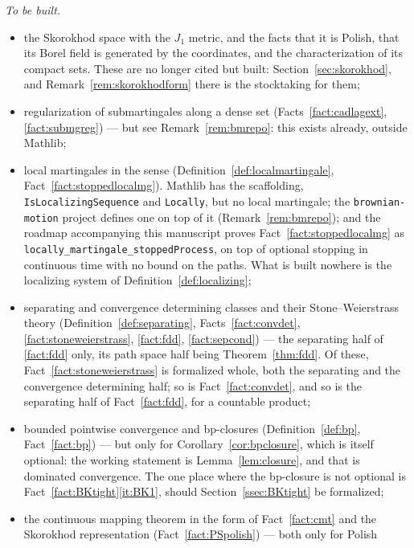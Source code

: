 \documentclass[11pt,a4paper]{article}
\theoremstyle{plain}
\theoremstyle{definition}
\theoremstyle{remark}
\newcommand{\EK}{\cite{EK86}}
\begin{document}
\emph{To be built.}
\begin{itemize}
\item the Skorokhod space with the $J_1$ metric, and the facts that it is
  Polish, that its Borel field is generated by the coordinates, and the
  characterization of its compact sets.  These are no longer cited but built:
  Section~\ref{sec:skorokhod}, and Remark~\ref{rem:skorokhodform} there is the
  stocktaking for them;
\item regularization of submartingales along a dense set
  (Facts~\ref{fact:cadlagext}, \ref{fact:submgreg}) --- but see
  Remark~\ref{rem:bmrepo}: this exists already, outside Mathlib;
\item local martingales in the \EK{} sense
  (Definition~\ref{def:localmartingale}, Fact~\ref{fact:stoppedlocalmg}).
  Mathlib has the scaffolding, \texttt{IsLocalizing}\allowbreak\texttt{Sequence} and
  \texttt{Locally}, but no local martingale; the
  \texttt{brownian-}\allowbreak\texttt{motion} project defines one on top of it (Remark~\ref{rem:bmrepo}); and the roadmap
  accompanying this manuscript proves Fact~\ref{fact:stoppedlocalmg} as
  \texttt{locally\_}\allowbreak\texttt{martingale\_}\allowbreak\texttt{stoppedProcess},
  on top of optional stopping in continuous time with no bound on the paths.
  What is built nowhere is the localizing system of
  Definition~\ref{def:localizing};
\item separating and convergence determining classes and their Stone--Weierstrass
  theory (Definition~\ref{def:separating},
  Facts~\ref{fact:convdet}, \ref{fact:stoneweierstrass}, \ref{fact:fdd},
  \ref{fact:sepcond}) --- the separating half of \ref{fact:fdd} only, its path
  space half being Theorem~\ref{thm:fdd}.  Of these,
  Fact~\ref{fact:stoneweierstrass} is formalized whole, both the separating and
  the convergence determining half; so is Fact~\ref{fact:convdet}, and so is the
  separating half of Fact~\ref{fact:fdd}, for a countable product;
\item bounded pointwise convergence and bp-closures
  (Definition~\ref{def:bp}, Fact~\ref{fact:bp}) --- but only for
  Corollary~\ref{cor:bpclosure}, which is itself optional: the working statement
  is Lemma~\ref{lem:closure}, and that is dominated convergence.  The one place
  where the bp-closure is not optional is Fact~\ref{fact:BKtight}\ref{it:BK1},
  should Section~\ref{ssec:BKtight} be formalized;
\item the continuous mapping theorem in the form of Fact~\ref{fact:cmt} and the
  Skorokhod representation (Fact~\ref{fact:PSpolish}) --- both only for Polish

\end{itemize}
\end{document}
